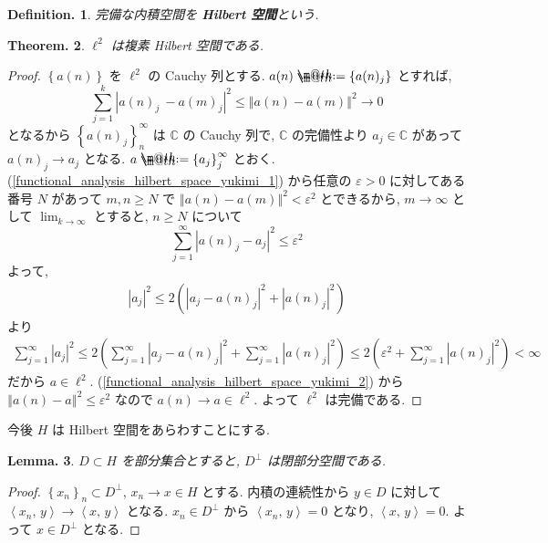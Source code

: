 \documentclass[openany, a4paper, oneside]{jsbook}
\makeatletter
\newcommand*{\defeq}{\mathrel{\rlap{%
\raisebox{0.3ex}{$\m@th\cdot$}}%
\raisebox{-0.3ex}{$\m@th\cdot$}}%
=}
\theoremstyle{break}
\theoremstyle{breakdefn}
\newtheorem{thm}{Theorem.}[section]
\newtheorem{lem}[thm]{Lemma.}
\newtheorem{defn}[thm]{Definition.}
\newcommand{\abs}[1]{\left|#1\right|}
\newcommand{\norm}[1]{\left\Vert#1\right\Vert}
\newcommand{\rbk}[1]{\left (#1\right)}
\newcommand{\cbk}[1]{\left\{#1\right\}}
\newcommand{\bkt}[2]{\left\langle#1,\,#2\right\rangle}
\newcommand{\bbC}{\mathbb{C}}
\newcommand{\upbf}[1]{\textup{\textbf{#1}}}
\makeatother
\begin{document}
\begin{defn}
 完備な内積空間を \upbf{Hilbert 空間}という.
\end{defn}
\begin{thm}
 $\ell^2$ は複素 Hilbert 空間である.
\end{thm}
\begin{proof}
$\cbk{a (n)}$ を $\ell^2$ の Cauchy 列とする.
$a(n) \defeq \cbk{a (n)_{j}}$ とすれば,
\begin{equation}
 \sum_{j=1}^k \abs{a (n)_{j}\ - a (m)_{j}}^2
 \leq
 \norm{a (n) - a (m)}^2
 \longrightarrow 0 \label{functional_analysis_hilbert_space_yukimi_1}
\end{equation}
となるから $\cbk{a (n)_{j}}_{n}^\infty$ は $\bbC$ の Cauchy 列で,
$\bbC$ の完備性より $a_{j} \in \bbC$ があって $a (n)_{j} \longrightarrow a_{j}$ となる.
$a \defeq \cbk{a_{j}}_{j}^\infty$ とおく.
(\ref{functional_analysis_hilbert_space_yukimi_1}) から任意の $\varepsilon > 0$ に対してある番号 $N$ があって
$m, n \geq N$ で $\norm{a (n) - a (m)}^2 < \varepsilon^2$ とできるから,
$m \longrightarrow \infty$ として $\lim_{k \to \infty}$ とすると, $n \geq N$ について
\begin{equation}
 \sum_{j=1}^\infty \abs{a (n)_{j} - a_{j}}^2
 \leq
 \varepsilon^2 \label{functional_analysis_hilbert_space_yukimi_2}
\end{equation}
よって,
\begin{align}
 \abs{a_{j}}^2
 \leq
 2 \rbk{\abs{a_j - a(n)_j}^2 + \abs{a(n)_{j}}^2}
\end{align}
より
\begin{align}
 \sum_{j=1}^\infty \abs{a_{j}}^2
 \leq
 2 \rbk{\sum_{j=1}^\infty \abs{a_{j} -a (n)_{j}}^2 + \sum_{j=1}^\infty \abs{a (n)_{j}}^2}
 \leq
 2 \rbk{\varepsilon^2 + \sum_{j=1}^\infty \abs{a (n)_{j}}^2}
 <
 \infty
\end{align}
だから $a \in \ell^2$.
(\ref{functional_analysis_hilbert_space_yukimi_2}) から
$\norm{a(n) - a}^2 \leq \varepsilon^2$
なので $a(n) \longrightarrow a \in \ell^2$.
よって $\ell^2$ は完備である.
\end{proof}

今後 $H$ は Hilbert 空間をあらわすことにする.
\begin{lem}\label{functional_analysis_hilbert_space_yukimi_5}
 $D \subset H$ を部分集合とすると, $D^{\perp}$ は閉部分空間である.
\end{lem}
\begin{proof}
$\cbk{x_n}_n \subset D^{\perp}$, $x_n \to x \in H$ とする.
内積の連続性から $y \in D$ に対して $\bkt{x_n}{y} \to \bkt{x}{y}$ となる.
$x_{n} \in D^{\perp}$ から $\bkt{x_n}{y} = 0$ となり, $\bkt{x}{y} = 0$.
よって $x \in D^{\perp}$ となる.
\end{proof}
\end{document}
